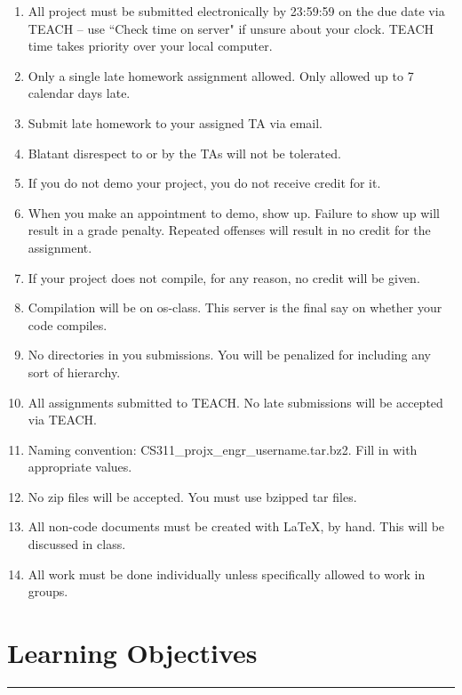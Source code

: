 \documentclass[letterpaper,10pt,titlepage,fleqn]{article}
\begin{document}
\begin{enumerate}
\item All project must be submitted electronically by 23:59:59 on the due date via TEACH – use ``Check time on server" if unsure about your clock. TEACH time takes priority over your local computer.
\item Only a single late homework assignment allowed. Only allowed up to 7 calendar days late.
\item Submit late homework to your assigned TA via email.
\item Blatant disrespect to or by the TAs will not be tolerated. 
\item If you do not demo your project, you do not receive credit for it. 
\item When you make an appointment to demo, show up. Failure to show up will result in a grade penalty. Repeated offenses will result in no credit for the assignment. 
\item If your project does not compile, for any reason, no credit will be given.
\item Compilation will be on os-class. This server is the ﬁnal say on whether your code compiles. 
\item No directories in you submissions. You will be penalized for including any sort of hierarchy.
\item All assignments submitted to TEACH. No late submissions will be accepted via TEACH.
\item Naming convention: CS311\_proj\textlangle x\textrangle \_\textlangle engr\_username\textrangle.tar.bz2. Fill \textlangle \textrangle  in with appropriate values.
\item No zip ﬁles will be accepted. You must use bzipped tar ﬁles.
\item All non-code documents must be created with LaTeX, by hand. This will be discussed in class.
\item All work must be done individually unless speciﬁcally allowed to work in groups.
\end{enumerate}

\section*{Learning Objectives}
\hrule
\end{document}
